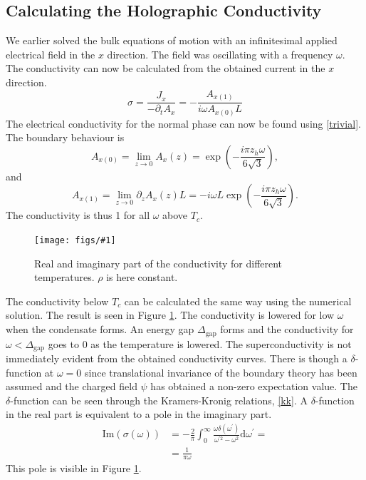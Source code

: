 \documentclass[12pt]{report}
\renewcommand{\d}{\ensuremath{\mathrm{d}}}
\renewcommand{\i}{\ensuremath{i}}
\newcommand{\im}{\ensuremath{\mathrm{Im}}}
\newcommand{\fig}[2]{
\begin{figure}
\centering
\texttt{[image: figs/\#1]}
\caption{#2}
\end{figure}
}
\begin{document}
\subsection{Calculating the Holographic Conductivity}
We earlier solved the bulk equations of motion with an infinitesimal applied electrical field in the $x$ direction. The field was oscillating with a frequency $\omega$. The conductivity can now be calculated from the obtained current in the $x$ direction.
\begin{equation}
 \sigma=\frac{J_x}{-\partial_tA_x}=-\frac{A_{x(1)}}{\i\omega A_{x(0)}L}
\end{equation}
The electrical conductivity for the normal phase can now be found using \eqref{trivial}. The boundary behaviour is
\begin{equation}
    A_{x(0)}=\lim_{z\rightarrow0} A_x(z) =  \exp\left(-\frac{\i\pi z_h\omega}{6\sqrt{3}}\right),                                                                                 
\end{equation}
and
\begin{equation}
    A_{x(1)}=\lim_{z\rightarrow0} \partial_zA_x(z)L   = -\i\omega L\exp\left(-\frac{\i\pi z_h\omega}{6\sqrt{3}}\right).      
\end{equation}
The conductivity is thus 1 for all $\omega$ above $T_c$.\\

\fig{cond_Ts_a2_0.0_v2.pdf}{Real and imaginary part of the conductivity for different temperatures. $\rho$ is here constant.\label{f:cond}}

The conductivity below $T_c$ can be calculated the same way using the numerical solution. The result is seen in Figure \ref{f:cond}. The conductivity is lowered for low $\omega$ when the condensate forms. An energy gap $\Delta_\mathrm{gap}$ forms and the conductivity for $\omega<\Delta_\mathrm{gap}$ goes to 0 as the temperature is lowered. The superconductivity is not immediately evident from the obtained conductivity curves. There is though a $\delta$-function at $\omega=0$ since translational invariance of the boundary theory has been assumed and the charged field $\psi$ has obtained a non-zero expectation value. The $\delta$-function can be seen through the Kramers-Kronig relations, \eqref{kk}. A $\delta$-function in the real part is equivalent to a pole in the imaginary part.
\begin{equation}
\begin{split}
\im(\sigma(\omega))&=-\frac{2}{\pi}\int_0^\infty\frac{\omega\delta(\omega^\prime)}{\omega^{\prime 2}-\omega^2}\d \omega^\prime=\\
&=\frac{1}{\pi\omega}
\end{split}
\end{equation}
This pole is visible in Figure \ref{f:cond}.
\end{document}
